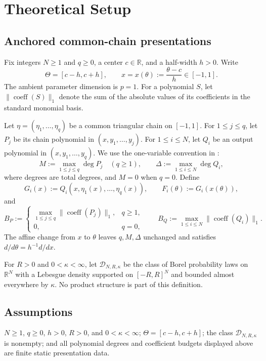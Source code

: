 \section{Theoretical Setup}

\subsection{Anchored common-chain presentations}

Fix integers $N\geq 1$ and $q\geq 0$, a center $c\in\mathbb R$, and a
half-width $h>0$.  Write
\[
\Theta=[c-h,c+h],
\qquad
x=x(\theta):=\frac{\theta-c}{h}\in[-1,1].
\]
The ambient parameter dimension is $p=1$.  For a polynomial $S$, let
$\|\operatorname{coeff}(S)\|_1$ denote the sum of the absolute values of its
coefficients in the standard monomial basis.

Let $\eta=(\eta_1,\ldots,\eta_q)$ be a common triangular chain on
$[-1,1]$.  For $1\leq j\leq q$, let $P_j$ be its chain polynomial in
$(x,y_1,\ldots,y_j)$.  For $1\leq i\leq N$, let $Q_i$ be an output
polynomial in $(x,y_1,\ldots,y_q)$.  We use the one-variable convention in
\citep{balcan2025pfaffian}:
\[
M:=\max_{1\leq j\leq q}\deg P_j\quad(q\geq1),
\qquad
\Delta:=\max_{1\leq i\leq N}\deg Q_i,
\]
where degrees are total degrees, and $M=0$ when $q=0$.  Define
\[
G_i(x):=Q_i(x,\eta_1(x),\ldots,\eta_q(x)),
\qquad
F_i(\theta):=G_i(x(\theta)),
\]
and
\[
B_P:=
\begin{cases}
\displaystyle\max_{1\leq j\leq q}
 \|\operatorname{coeff}(P_j)\|_1,&q\geq1,\\
0,&q=0,
\end{cases}
\qquad
B_Q:=\max_{1\leq i\leq N}
 \|\operatorname{coeff}(Q_i)\|_1.
\]
The affine change from $x$ to $\theta$ leaves $q,M,\Delta$ unchanged and
satisfies $d/d\theta=h^{-1}d/dx$.

For $R>0$ and $0<\kappa<\infty$, let $\mathcal D_{N,R,\kappa}$ be the class
of Borel probability laws on $\mathbb R^N$ with a Lebesgue density supported
on $[-R,R]^N$ and bounded almost everywhere by $\kappa$.  No product
structure is part of this definition.

\subsection{Assumptions}

\begin{assumption}
\label{assump:parameter-regime}
$N\geq1$, $q\geq0$, $h>0$, $R>0$, and $0<\kappa<\infty$;
$\Theta=[c-h,c+h]$; the class $\mathcal D_{N,R,\kappa}$ is nonempty; and all
polynomial degrees and coefficient budgets displayed above are finite static
presentation data.
\end{assumption}

